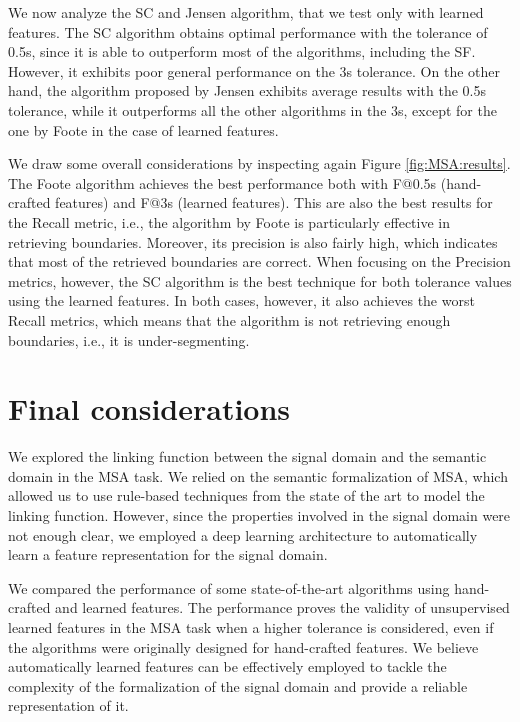 We now analyze the SC and Jensen algorithm, that we test only with learned features. The SC algorithm obtains optimal performance with the tolerance of 0.5s, since it is able to outperform most of the algorithms, including the SF. However, it exhibits poor general performance on the 3s tolerance. On the other hand, the algorithm proposed by Jensen exhibits average results with the 0.5s tolerance, while it outperforms all the other algorithms in the 3s, except for the one by Foote in the case of learned features. 

We draw some overall considerations by inspecting again Figure \ref{fig:MSA:results}. The Foote algorithm achieves the best performance both with F@0.5s (hand-crafted features) and F@3s (learned features). This are also the best results for the Recall metric, i.e., the algorithm by Foote is particularly effective in retrieving boundaries. Moreover, its precision is also fairly high, which indicates that most of the retrieved boundaries are correct. When focusing on the Precision metrics, however, the SC algorithm is the best technique for both tolerance values using the learned features. In both cases, however, it also achieves the worst Recall metrics, which means that the algorithm is not retrieving enough boundaries, i.e., it is under-segmenting.

\section{Final considerations}
We explored the linking function between the signal domain and the semantic domain in the MSA task. %
We relied on the semantic formalization of MSA, which allowed us to use rule-based techniques from the state of the art to model the linking function. However, since the properties involved in the signal domain were not enough clear, we employed a deep learning architecture to automatically learn a feature representation for the signal domain.

We compared the performance of some state-of-the-art algorithms using hand-crafted and learned features. The performance proves the validity of unsupervised learned features in the MSA task when a higher tolerance is considered, even if the algorithms were originally designed for hand-crafted features. We believe automatically learned features can be effectively employed to tackle the complexity of the formalization of the signal domain and provide a reliable representation of it.
